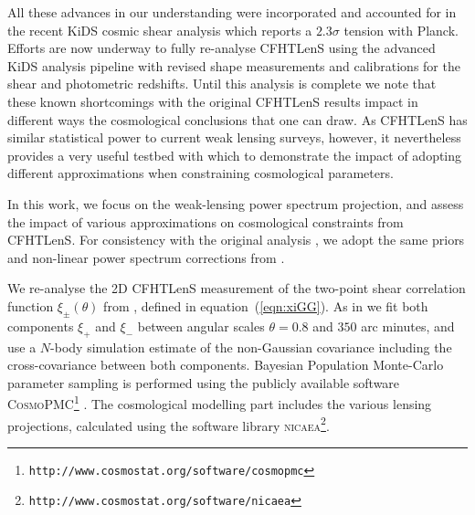 %
All these advances in our understanding were incorporated and accounted for in
the recent KiDS cosmic shear analysis \citep{KiDS-450} which reports a $2.3
\sigma$ tension with Planck.  Efforts are now underway to fully re-analyse
CFHTLenS using the advanced KiDS analysis pipeline with revised shape
measurements and calibrations for the shear and photometric redshifts. Until
this analysis is complete we note that these known shortcomings with the
original CFHTLenS results impact in different ways the cosmological conclusions
that one can draw. As CFHTLenS has similar statistical power
to current weak lensing surveys, however, it nevertheless provides a very
useful testbed with which to demonstrate the impact of adopting different
approximations when constraining cosmological parameters.


In this work, we focus on the weak-lensing power spectrum projection, and
assess the impact of various approximations on cosmological constraints from
CFHTLenS. For consistency with the original analysis
\citep{CFHTLenS-2pt-notomo}, we adopt the same priors and non-linear power
spectrum corrections from \cite{2003MNRAS.341.1311S}.

We re-analyse the 2D CFHTLenS measurement of the two-point shear correlation
function $\xi_\pm(\theta)$ from \cite{CFHTLenS-2pt-notomo}, defined in
equation~(\ref{eqn:xiGG}). As in \cite{CFHTLenS-2pt-notomo} we fit both
components $\xi_+$ and $\xi_-$ between angular scales $\theta = 0.8$ and $350$
arc minutes, and use a $N$-body simulation estimate of the non-Gaussian
covariance including the cross-covariance between both components. Bayesian
Population Monte-Carlo parameter sampling is performed using the publicly
available software
\textsc{CosmoPMC}\footnote{\texttt{http://www.cosmostat.org/software/cosmopmc}}
\citep{WK09,KWR10}. The cosmological modelling part includes the various
lensing projections, calculated using the software library
\textsc{nicaea}\footnote{\texttt{http://www.cosmostat.org/software/nicaea}}.



